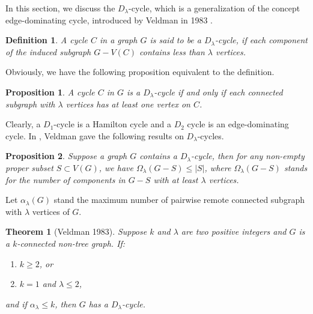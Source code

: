 \documentclass[12pt]{report}
\newtheorem{theorem}{Theorem}
\newtheorem{definition}{Definition}
\newtheorem{proposition}{Proposition}
\begin{document}
In this section, we discuss the $D_{\lambda}$-cycle, which is a generalization of the concept edge-dominating cycle, introduced by Veldman in 1983 \cite{veldman1983existence2}.

\begin{definition}
A cycle $C$ in a graph $G$ is said to be a $D_{\lambda}$-cycle, if each component of the induced subgraph $G-V(C)$ contains less than $\lambda$ vertices.
\end{definition}

Obviously, we have the following proposition equivalent to the definition.
\begin{proposition}
A cycle $C$ in $G$ is a $D_{\lambda}$-cycle if and only if each connected subgraph with $\lambda$ vertices has at least one vertex on $C$.
\end{proposition}

Clearly, a $D_1$-cycle is a Hamilton cycle and a $D_2$ cycle is an edge-dominating cycle.
In \cite{veldman1983existence2}, Veldman gave the following results on $D_{\lambda}$-cycles.
\begin{proposition}\label{thm1inveldlamc83}
Suppose a graph $G$ contains a $D_{\lambda}$-cycle, then for any non-empty proper subset $S\subset V(G)$, we have $\Omega_{\lambda}(G-S)\le|S|$, where $\Omega_{\lambda}(G-S)$ stands for the number of components in $G-S$ with at least $\lambda$ vertices.
\end{proposition}

Let $\alpha_{\lambda}(G)$ stand the maximum number of pairwise remote connected subgraph with $\lambda$ vertices of $G$.

\begin{theorem}[Veldman 1983]\label{thm2inveldlamc83}
Suppose $k$ and $\lambda$ are two positive integers and $G$ is a $k$-connected non-tree graph. If:
\begin{enumerate}
\item $k\ge2$, or
\item $k=1$ and $\lambda\le2$,
\end{enumerate}
and if $\alpha_{\lambda}\le k$, then $G$ has a $D_{\lambda}$-cycle.
\end{theorem}
\end{document}
